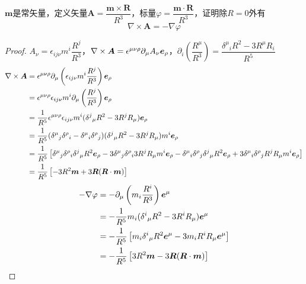 \documentclass{mynote}
\begin{document}
\begin{exercise}{1.6}
    $\bm{m}$是常矢量，定义矢量$\bm{A} = \dfrac{\bm{m} \times \bm{R}}{R^3}$，标量$\varphi = \dfrac{\bm{m} \cdot \bm{R}}{R^3}$，证明除$R= 0 $外有
    \[
    \nabla \times \bm{A} = -\nabla \varphi    
    \]
\end{exercise}
\begin{proof}
    $A_{\nu} = \epsilon_{ij \nu} m^{i} \dfrac{R^{j}}{R^3}$，$\nabla \times \boldsymbol{A} = \epsilon^{\mu \nu \rho} \partial_{\mu} A_{\nu} \boldsymbol{e}_{\rho}$，$\partial_i \left( \dfrac{R^{\mu}}{R^3}  \right) = \dfrac{{\delta^{\mu}}_i R^2 - 3R^{\mu}R_{i}}{R^5}$
    \begin{align*}
        \nabla \times \boldsymbol{A} &= \epsilon^{\mu \nu \rho} \partial_{\mu} \left(\epsilon_{ij \nu} m^{i} \dfrac{R^{j}}{R^3}\right) \boldsymbol{e}_{\rho} \\
         &= \epsilon^{\mu \nu \rho}\epsilon_{ij \nu} m^i \partial_{\mu} \left(\dfrac{R^{j}}{R^3}\right) \boldsymbol{e}_{\rho} \\
         &= \frac{1}{R^5} \epsilon^{\mu \nu \rho}\epsilon_{ij \nu} m^i ({\delta^{j}}_{\mu} R^2 - 3R^{j}R_{\mu}) \boldsymbol{e}_{\rho} \\
         &= \frac{1}{R^5} ({\delta^{\mu}}_{j}{\delta^{\rho}}_{i} - {\delta^{\mu}}_{i}{\delta^{\rho}}_{j}) ({\delta^{j}}_{\mu} R^2 - 3R^{j}R_{\mu}) m^i \boldsymbol{e}_{\rho} \\
         &= \frac{1}{R^5} \left[ {\delta^{\mu}}_{j}{\delta^{\rho}}_{i} {\delta^{j}}_{\mu} R^2 \boldsymbol{e}_{\rho} - 3 {\delta^{\mu}}_{j}{\delta^{\rho}}_{i} 3R^{j}R_{\mu} m^i \boldsymbol{e}_{\rho} - {\delta^{\mu}}_{i}{\delta^{\rho}}_{j}{\delta^{j}}_{\mu} R^2 \boldsymbol{e}_{\rho} + 3{\delta^{\mu}}_{i}{\delta^{\rho}}_{j} R^{j}R_{\mu} m^i \boldsymbol{e}_{\rho} \right]\\
         &= \frac{1}{R^5} \left[-3R^2 \boldsymbol{m}  + 3\boldsymbol{R} (\boldsymbol{R} \cdot \boldsymbol{m})\right]
    \end{align*}
    \begin{align*}
        -\nabla \varphi &= -\partial_{\mu} \left( m_i \frac{R^i}{R^3} \right) \boldsymbol{e}^{\mu} \\
        &= -\frac{1}{R^5} m_i ({\delta^i}_{\mu} R^2 - 3R^iR_{\mu})\boldsymbol{e}^{\mu} \\
        &= -\frac{1}{R^5} \left[ m_i {\delta^i}_{\mu} R^2 \boldsymbol{e}^{\mu} -  3 m_i R^iR_{\mu}\boldsymbol{e}^{\mu}  \right] \\
        &= -\frac{1}{R^5} \left[3R^2 \boldsymbol{m}  - 3\boldsymbol{R} (\boldsymbol{R} \cdot \boldsymbol{m})\right]
    \end{align*}

\end{proof}
\end{document}

